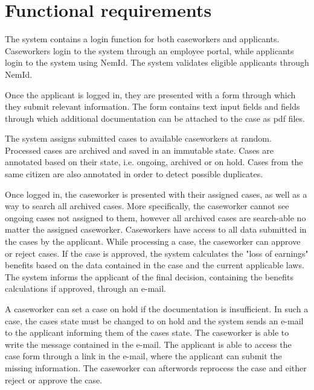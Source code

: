 \newpage
\section{Functional requirements}

The system contains a login function for both caseworkers and applicants. Caseworkers login to the system through an employee portal, while applicants login to the system using NemId. The system validates eligible applicants through NemId.

\vspace{2mm}

Once the applicant is logged in, they are presented with a form through which they submit relevant information. The form contains text input fields and fields through which additional documentation can be attached to the case as pdf files.

\vspace{2mm}

The system assigns submitted cases to available caseworkers at random. Processed cases are archived and saved in an immutable state. Cases are annotated based on their state, i.e. ongoing, archived or on hold. Cases from the same citizen are also annotated in order to detect possible duplicates.

\vspace{2mm}

Once logged in, the caseworker is presented with their assigned cases, as well as a way to search all archived cases. More specifically, the caseworker cannot see ongoing cases not assigned to them, however all archived cases are search-able no matter the assigned caseworker. Caseworkers have access to all data submitted in the cases by the applicant. While processing a case, the caseworker can approve or reject cases. If the case is approved, the system calculates the "loss of earnings" benefits based on the data contained in the case and the current applicable laws. The system informs the applicant of the final decision, containing the benefits calculations if approved, through an e-mail.

\vspace{2mm}

A caseworker can set a case on hold if the documentation is insufficient. In such a case, the cases state must be changed to on hold and the system sends an e-mail to the applicant informing them of the cases state. The caseworker is able to write the message contained in the e-mail. The applicant is able to access the case form through a link in the e-mail, where the applicant can submit the missing information.
The caseworker can afterwords reprocess the case and either reject or approve the case.

